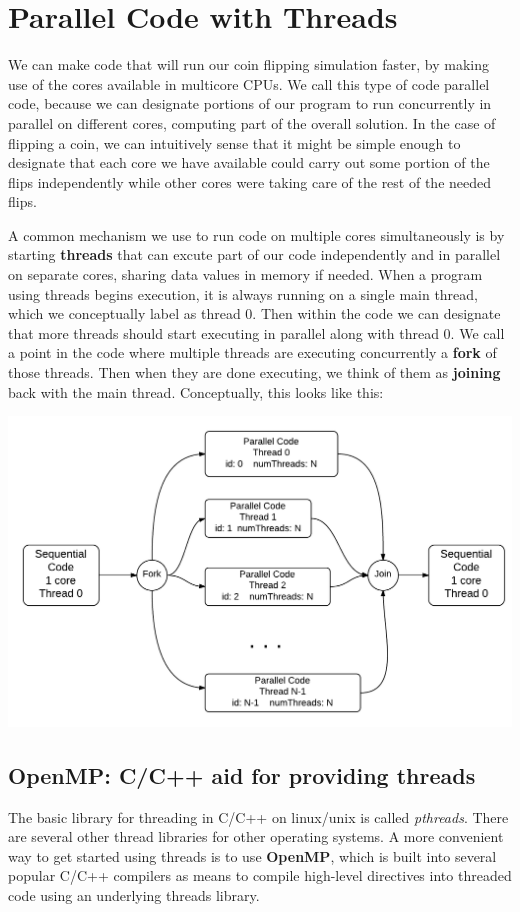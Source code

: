 \documentclass[letterpaper,10pt,openany,oneside]{sphinxmanual}
\begin{document}
\chapter{Parallel Code with Threads}
\label{Threads/Threads_OMP:parallel-code-with-threads}\label{Threads/Threads_OMP::doc}
We can make code that will run our coin flipping simulation faster, by making use of the cores available in multicore CPUs.  We call this type of code parallel code, because we can designate portions of our program to run concurrently in parallel on different cores, computing part of the overall solution.  In the case of flipping a coin, we can intuitively sense that it might be simple enough to designate that each core we have available could carry out some portion of the flips independently while other cores were taking care of the rest of the needed flips.

A common mechanism we use to run code on multiple cores simultaneously is by starting \textbf{threads} that can excute part of our code independently and in parallel on separate cores, sharing data values in memory if needed.  When a program using threads begins execution, it is always running on a single main thread, which we conceptually label as thread 0.  Then within the code we can designate that more threads should start executing in parallel along with thread 0.  We call a point in the code where multiple threads are executing concurrently a \textbf{fork} of those threads.  Then when they are done executing, we think of them as \textbf{joining} back with the main thread. Conceptually, this looks like this:

\includegraphics{ForkJoin_SPMD.png}


\section{OpenMP: C/C++ aid for providing threads}
\label{Threads/Threads_OMP:openmp-c-c-aid-for-providing-threads}
The basic library for threading in C/C++ on linux/unix is called \emph{pthreads}.  There are several other thread libraries for other operating systems.  A more convenient way to get started using threads is to use \textbf{OpenMP}, which is built into several popular C/C++ compilers as means to compile high-level directives into threaded code using an underlying threads library.
\end{document}
